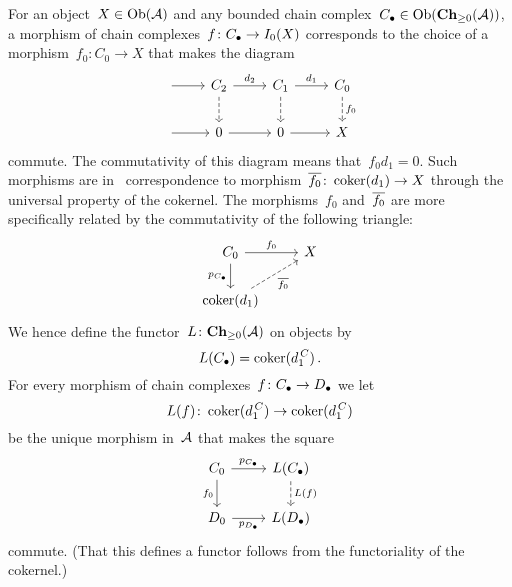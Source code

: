 \section{}





\subsection{}

For an object~$X \in \operatorname{Ob}(\mathcal{A})$ and any bounded chain complex~$C_\bullet \in \operatorname{Ob}(\mathbf{Ch}_{\geq 0}(\mathcal{A}))$, a morphism of chain complexes~$f \colon C_\bullet \to I_0(X)$ corresponds to the choice of a morphism~$f_0 \colon C_0 \to X$ that makes the diagram
\[
  \begin{tikzcd}
      {}
      \arrow{r}
    & C_2
      \arrow{r}[above]{d_2}
      \arrow[dashed]{d}
    & C_1
      \arrow{r}[above]{d_1}
      \arrow[dashed]{d}
    & C_0
      \arrow[dashed]{d}[right]{f_0}
    \\
      {}
      \arrow{r}
    & 0
      \arrow{r}
    & 0
      \arrow{r}
    & X
  \end{tikzcd}
\]
commute.
The commutativity of this diagram means that~$f_0 d_1 = 0$.
Such morphisms are in~{\onetoone} correspondence to morphism~$\overline{f_0} \colon \operatorname{coker}(d_1) \to X$ through the universal property of the cokernel.
The morphisms~$f_0$ and~$\overline{f_0}$ are more specifically related by the commutativity of the following triangle:
\[
  \begin{tikzcd}
      C_0
      \arrow{r}[above]{f_0}
      \arrow{d}[left]{p_{\Ccc}}
    & X
      \\
      \coker(d_1)
      \arrow[dashed]{ur}[below right]{\induced{f_0}}
    & {}
  \end{tikzcd}
\]
We hence define the functor~$L \colon \mathbf{Ch}_{\geq 0}(\mathcal{A})$ on objects by
\[
  L(C_\bullet)
  =
  \operatorname{coker}(d^{\,C}_1) \,.
\]
For every morphism of chain complexes~$f \colon C_\bullet \to D_\bullet$ we let
\[
  L(f)
  \colon
  \operatorname{coker}(d^{\,C}_1)
  \to
  \operatorname{coker}(d^{\,C}_1)
\]
be the unique morphism in~$\mathcal{A}$ that makes the square
\[
  \begin{tikzcd}
      C_0
      \arrow{r}[above]{p_{\Ccc}}
      \arrow{d}[left]{f_0}
    & L(\Ccc)
      \arrow[dashed]{d}[right]{L(f)}
    \\
      D_0
      \arrow{r}[below]{p_{\Dcc}}
    & L(\Dcc)
  \end{tikzcd}
\]
commute.
(That this defines a functor follows from the functoriality of the cokernel.)

